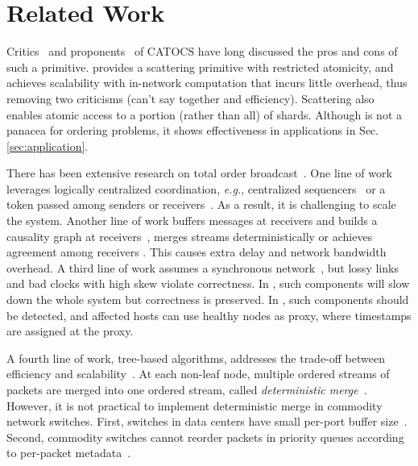 \section{Related Work}
\label{sec:related}

Critics~\cite{cheriton1994understanding} and proponents~\cite{birman1994response,van1994bother} of CATOCS have long discussed the pros and cons of such a primitive.
\sys provides a scattering primitive with restricted atomicity, and achieves scalability with in-network computation that incurs little overhead, thus removing two criticisms (can't say together and efficiency).
Scattering also enables atomic access to a portion (rather than all) of shards.
Although \sys is not a panacea for ordering problems, it shows effectiveness in applications in Sec.\ref{sec:application}.

There has been extensive research on total order broadcast~\cite{defago2004total}.
One line of work leverages logically centralized coordination, \textit{e.g.}, centralized sequencers~\cite{birman1991lightweight,kaashoek1996evaluation,eris} or a token passed among senders or receivers~\cite{rajagopalan1989token,moser1996totem,kim1997total,ekwall2004token}.
As a result, it is challenging to scale the system.
Another line of work buffers messages at receivers and builds a causality graph at receivers~\cite{lamport1978time,peterson1989preserving}, merges streams deterministically or achieves agreement among receivers \cite{birman1987exploiting,chandra1996unreliable,pedone1998optimistic,junqueira2011zab}.
This causes extra delay and network bandwidth overhead.
A third line of work assumes a synchronous network~\cite{lamport1984using}, but lossy links and bad clocks with high skew violate correctness. In \sys{}, such components will slow down the whole system but correctness is preserved. In \sys{}, such components should be detected, and affected hosts can use healthy nodes as proxy, where timestamps are assigned at the proxy.

A fourth line of work, tree-based algorithms, addresses the trade-off between efficiency and scalability~\cite{rodrigues1998scalable}.
At each non-leaf node, multiple ordered streams of packets are merged into one ordered stream, called \textit{deterministic merge}~\cite{hadzilacos1994modular,aguilera2000efficient}.
However, it is not practical to implement deterministic merge in commodity network switches.
First, switches in data centers have small per-port buffer size~\cite{bai2017congestion}.
Second, commodity switches cannot reorder packets in priority queues according to per-packet metadata~\cite{sivaraman2016programmable,jin2018netchain}.


